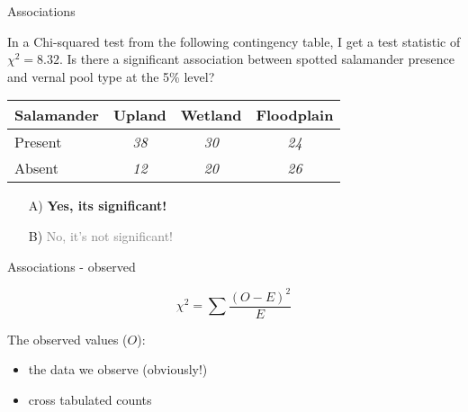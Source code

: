 \documentclass[
  ignorenonframetext,
  t]{beamer}
\providecommand{\tightlist}{%
  \setlength{\itemsep}{0pt}\setlength{\parskip}{0pt}}
\begin{document}
\begin{frame}{Associations}
\protect\hypertarget{associations-6}{}

In a Chi-squared test from the following contingency table, I get a test
statistic of \(\chi^2 = 8.32\). Is there a significant association
between spotted salamander presence and vernal pool type at the 5\%
level?

\vspace{0.5cm}

\centering

\begin{tabular}{lccc}
\hline     
Salamander & Upland & Wetland & Floodplain \\ \hline
Present    & \emph{38}    & \emph{30} & \emph{24} \\   
Absent   & \emph{12}    & \emph{20} & \emph{26} \\ 
\hline
\end{tabular}

\vspace{1cm}

\begin{enumerate}[\hspace{0.5cm}A.]
  \item[A)] \textbf{Yes, its significant!}
  \item[B)] \textcolor{gray}{No, it's not significant!}
\end{enumerate}


\end{frame}

\begin{frame}{Associations - observed}
\protect\hypertarget{associations---observed}{}

\[ \chi^2 = \sum \frac{(O-E)^2}{E}\]

The observed values (\(O\)):

\begin{itemize}
\tightlist
\item
  the data we observe (obviously!)
\item
  cross tabulated counts
\end{itemize}

\end{frame}
\end{document}
